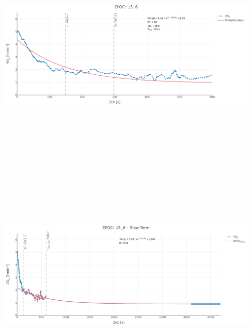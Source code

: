 \documentclass[
  letterpaper,
  DIV=11]{scrartcl}
\begin{document}
\includegraphics[width=11.45833in,height=4.6875in]{images/15_6_tau.png}
\includegraphics[width=11.45833in,height=4.6875in]{images/15_6_slow.png}
\end{document}
